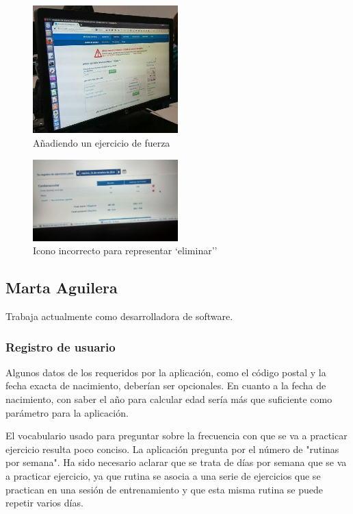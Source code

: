 \documentclass[a4paper]{article}
\begin{document}
			\begin{figure}[!h]
				\centering
				\includegraphics[width=0.5\textwidth]{./figuras/jonat-3.jpg}
				\caption{Añadiendo un ejercicio de fuerza}
			\end{figure}
			
			\begin{figure}[!h]
				\centering
				\includegraphics[width=0.5\textwidth]{./figuras/jonat-4.jpg}
				\caption{Icono incorrecto para representar `eliminar''}
			\end{figure}
		
		\FloatBarrier
		
		\subsection{Marta Aguilera}
		
		Trabaja actualmente como desarrolladora de software.
		
			\subsubsection*{Registro de usuario}
			
			Algunos datos de los requeridos por la aplicación, como el código postal y la fecha exacta de nacimiento, deberían ser opcionales. En cuanto a la fecha de nacimiento, con saber el año para calcular edad sería más que suficiente como parámetro para la aplicación.
			
			El vocabulario usado para preguntar sobre la frecuencia con que se va a practicar ejercicio resulta poco conciso. La aplicación pregunta por el número de "rutinas por semana". Ha sido necesario aclarar que se trata de días por semana que se va a practicar ejercicio, ya que rutina se asocia a una serie de ejercicios que se practican en una sesión de entrenamiento y que esta misma rutina se puede repetir varios días.
			
\end{document}
